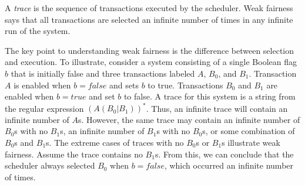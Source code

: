 A \emph{trace} is the sequence of transactions executed by the scheduler.
Weak fairness says that all transactions are selected an infinite number of times in any infinite run of the system.

The key point to understanding weak fairness is the difference between selection and execution.
To illustrate, consider a system consisting of a single Boolean flag $b$ that is initially false and three transactions labeled $A$, $B_0$, and $B_1$.
Transaction $A$ is enabled when $b = false$ and sets $b$ to true.
Transactions $B_0$ and $B_1$ are enabled when $b = true$ and set $b$ to false.
A trace for this system is a string from the regular expression $(A(B_0|B_1))^*$.
Thus, an infinite trace will contain an infinite number of $A$s.
However, the same trace may contain an infinite number of $B_0$s with no $B_1$s, an infinite number of $B_1$s with no $B_0$s, or some combination of $B_0$s and $B_1$s.
The extreme cases of traces with no $B_0$s or $B_1$s illustrate weak fairness.
Assume the trace contains no $B_1$s.
From this, we can conclude that the scheduler always selected $B_0$ when $b = false$, which occurred an infinite number of times.

